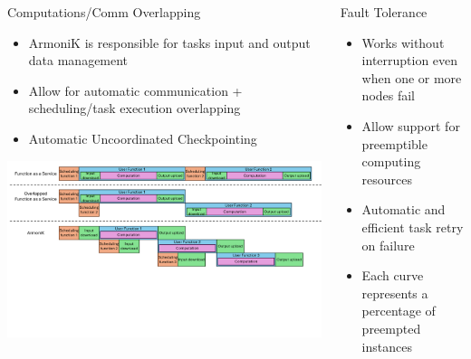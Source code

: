 \begin{frame}[fragile]
  \begin{columns}[T]
    \begin{column}{.47\textwidth}
          \begin{block}{Computations/Comm Overlapping}
              \begin{itemize}
              \item ArmoniK is responsible for tasks input and output data management
              \item Allow for automatic communication + scheduling/task execution overlapping
              \item Automatic Uncoordinated Checkpointing
              \end{itemize}
              \vspace{3.4ex}
              \centering
              \includegraphics[width=\textwidth, trim={0 6.5cm 0 0}, clip]{pipelining AK 2.pdf}
          \end{block}
    \end{column}

    \begin{column}{.47\textwidth}
            \begin{block}{Fault Tolerance}
              \begin{itemize}
              \item Works without interruption even when one or more nodes fail
              \item Allow support for preemptible computing resources
              \item Automatic and efficient task retry on failure
              \item Each curve represents a percentage of preempted instances
              \end{itemize}
              \begin{center}
                \vspace{0.2ex}
                
              \end{center}
            \end{block}
    \end{column}
  \end{columns}
  \vfill



\end{frame}
